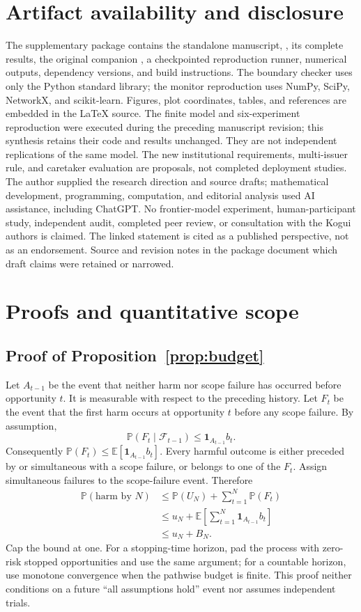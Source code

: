 \documentclass[10pt,twocolumn,letterpaper]{article}
\newcommand{\Prb}{\mathbb P}
\newcommand{\Exp}{\mathbb E}
\begin{document}
\section*{Artifact availability and disclosure}
The supplementary package contains the standalone manuscript, , its complete results, the original companion , a checkpointed reproduction runner, numerical outputs, dependency versions, and build instructions. The boundary checker uses only the Python standard library; the monitor reproduction uses NumPy, SciPy, NetworkX, and scikit-learn. Figures, plot coordinates, tables, and references are embedded in the \LaTeX{} source. The finite model and six-experiment reproduction were executed during the preceding manuscript revision; this synthesis retains their code and results unchanged. They are not independent replications of the same model. The new institutional requirements, multi-issuer rule, and caretaker evaluation are proposals, not completed deployment studies. The author supplied the research direction and source drafts; mathematical development, programming, computation, and editorial analysis used AI assistance, including ChatGPT. No frontier-model experiment, human-participant study, independent audit, completed peer review, or consultation with the Kogui authors is claimed. The linked statement is cited as a published perspective, not as an endorsement. Source and revision notes in the package document which draft claims were retained or narrowed.

\appendix
\section{Proofs and quantitative scope}
\label{app:proofs}

\subsection{Proof of Proposition~\ref{prop:budget}}
Let $A_{t-1}$ be the event that neither harm nor scope failure has occurred before opportunity $t$. It is measurable with respect to the preceding history. Let $F_t$ be the event that the first harm occurs at opportunity $t$ before any scope failure. By assumption,
\[
\Prb(F_t\mid\mathcal F_{t-1})\le\mathbf1_{A_{t-1}}b_t.
\]
Consequently $\Prb(F_t)\le\Exp[\mathbf1_{A_{t-1}}b_t]$. Every harmful outcome is either preceded by or simultaneous with a scope failure, or belongs to one of the $F_t$. Assign simultaneous failures to the scope-failure event. Therefore
\begin{align*}
\Prb(\text{harm by }N)
&\le \Prb(U_N)+\sum_{t=1}^{N}\Prb(F_t)\\
&\le u_N+\Exp\!\left[\sum_{t=1}^{N}\mathbf1_{A_{t-1}}b_t\right]\\
&\le u_N+B_N.
\end{align*}
Cap the bound at one. For a stopping-time horizon, pad the process with zero-risk stopped opportunities and use the same argument; for a countable horizon, use monotone convergence when the pathwise budget is finite. This proof neither conditions on a future ``all assumptions hold'' event nor assumes independent trials.
\end{document}
